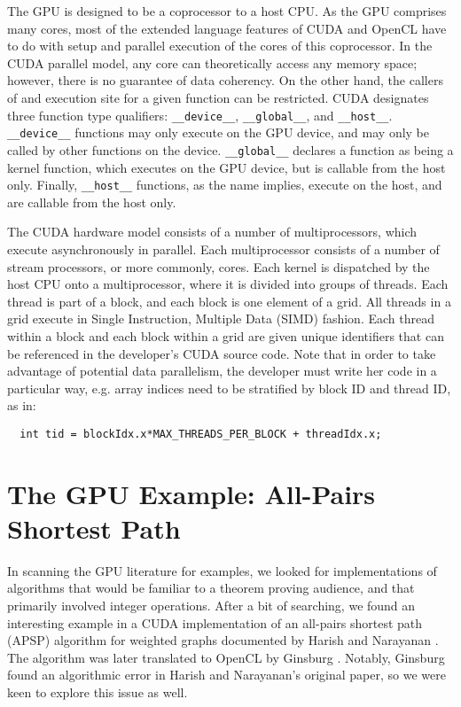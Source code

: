 \documentclass[copyright]{eptcs}
\begin{document}
The GPU is designed to be a coprocessor to a host CPU.  As the 
GPU comprises many cores, most of the extended language 
features of CUDA and OpenCL have to do with setup and parallel 
execution of the cores of this coprocessor.  In the CUDA parallel model, any
core can theoretically access any memory space; however, there is no
guarantee of data coherency.  On the other hand, the callers of and
execution site for a given function can be restricted.  CUDA designates three
function type qualifiers: \texttt{\_\_device\_\_}, \texttt{\_\_global\_\_},
and \texttt{\_\_host\_\_}.  \texttt{\_\_device\_\_} functions may only execute
on the GPU device, and may only be called by other functions on the
device.  \texttt{\_\_global\_\_} declares a function as being a
kernel function, which executes on the GPU device, but is callable from the
host only.  Finally, \texttt{\_\_host\_\_} functions, as the name implies,
execute on the host, and are callable from the host only.

The CUDA hardware model consists of a number of multiprocessors,
which execute asynchronously in parallel.  Each multiprocessor
consists of a number of stream processors, or more commonly, cores.  
Each kernel is dispatched by the host CPU onto a multiprocessor, where it
is divided into groups of threads.  Each thread is part of a block,
and each block is one element of a grid.  All threads in a grid execute
in Single Instruction, Multiple Data (SIMD) fashion.  Each thread
within a block and each block within a grid are given unique
identifiers that can be referenced in the developer's CUDA source code.  
Note that in order to take advantage of potential data parallelism, 
the developer must write her code in a particular way, e.g. array indices need to be 
stratified by block ID and thread ID, as in:

\begin{verbatim}
  int tid = blockIdx.x*MAX_THREADS_PER_BLOCK + threadIdx.x;
\end{verbatim}

\section{The GPU Example: All-Pairs Shortest Path}

In scanning the GPU literature for examples, we looked for
implementations of algorithms that would be familiar to a
theorem proving audience, and that primarily involved integer
operations.  After a bit of searching, we found an interesting 
example in a CUDA implementation of an all-pairs shortest path (APSP) 
algorithm for weighted graphs documented by Harish and Narayanan 
\cite{Harish2007}.  The algorithm was later translated to OpenCL by 
Ginsburg \cite{Ginsburg2011}.  Notably, Ginsburg found an algorithmic error in
Harish and Narayanan's original paper, so we were keen to explore this issue as
well.
\end{document}
